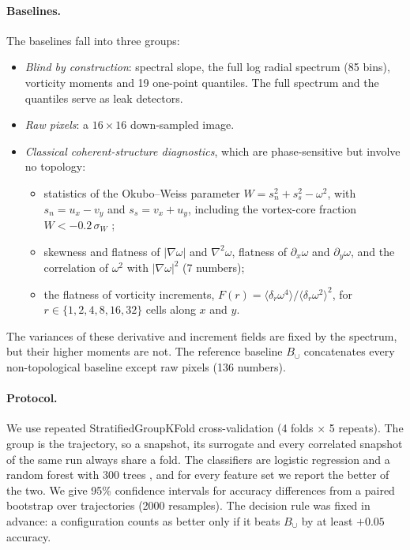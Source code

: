 \documentclass[11pt,a4paper]{article}
\begin{document}
\paragraph{Baselines.} The baselines fall into three groups:
\begin{itemize}
\item \emph{Blind by construction}: spectral slope, the full log radial
  spectrum (85 bins), vorticity moments and 19 one-point quantiles. The full
  spectrum and the quantiles serve as leak detectors.
\item \emph{Raw pixels}: a $16\times16$ down-sampled image.
\item \emph{Classical coherent-structure diagnostics}, which are phase-sensitive
  but involve no topology:
  \begin{itemize}
  \item statistics of the Okubo--Weiss parameter
    $W=s_n^2+s_s^2-\omega^2$, with $s_n=u_x-v_y$ and $s_s=v_x+u_y$,
    including the vortex-core fraction $W<-0.2\,\sigma_W$
    \cite{okubo1970,weiss1991,isern2006};
  \item skewness and flatness of $|\nabla\omega|$ and $\nabla^2\omega$,
    flatness of $\partial_x\omega$ and $\partial_y\omega$, and the
    correlation of $\omega^2$ with $|\nabla\omega|^2$ (7 numbers);
  \item the flatness of vorticity increments,
    $F(r)=\langle\delta_r\omega^4\rangle/\langle\delta_r\omega^2\rangle^2$,
    for $r\in\{1,2,4,8,16,32\}$ cells along $x$ and $y$.
  \end{itemize}
\end{itemize}
The variances of these derivative and increment fields are fixed by the
spectrum, but their higher moments are not. The reference baseline $B_\cup$ concatenates every non-topological baseline
except raw pixels (136 numbers).

\paragraph{Protocol.} We use repeated StratifiedGroupKFold cross-validation
(4 folds $\times$ 5 repeats). The group is the trajectory, so a snapshot, its
surrogate and every correlated snapshot of the same run always share a fold.
The classifiers are logistic regression and a random forest with 300 trees
\cite{sklearn}, and for every feature set we report the better of the two.
We give 95\% confidence intervals for accuracy differences from a paired
bootstrap over trajectories (2000 resamples). The decision rule was fixed in
advance: a configuration counts as better only if it beats $B_\cup$ by at
least $+0.05$ accuracy.
\end{document}
